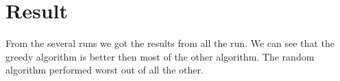 \chapter{Result}
From the several runs we got the results from all the run. We can see that the greedy algorithm is better then most of the other algorithm. The random algorithm performed worst out of all the other. 
